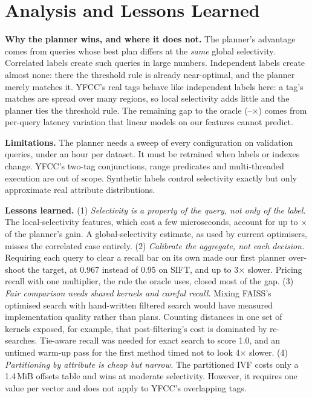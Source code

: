 \documentclass[sigconf,nonacm]{acmart}
\begin{document}
\begin{table}[t]
\centering\scriptsize\setlength{\tabcolsep}{2.6pt}
\caption{End-to-end live runs on test queries (target 0.95, calibration margin 0.005): recall@10 and mean/p95 latency (ms), planning time included; last column is the planner's planning time.}
\label{tab:live}

\end{table}

\section{Analysis and Lessons Learned}

\textbf{Why the planner wins, and where it does not.} The planner's advantage comes from queries whose best plan differs at the \emph{same} global selectivity. Correlated labels create such queries in large numbers. Independent labels create almost none: there the threshold rule is already near-optimal, and the planner merely matches it. YFCC's real tags behave like independent labels here: a tag's matches are spread over many regions, so local selectivity adds little and the planner ties the threshold rule. The remaining gap to the oracle (\mrOracleGapMin--\mrOracleGapMax$\times$) comes from per-query latency variation that linear models on our features cannot predict.

\textbf{Limitations.} The planner needs a sweep of every configuration on validation queries, under an hour per dataset. It must be retrained when labels or indexes change. YFCC's two-tag conjunctions, range predicates and multi-threaded execution are out of scope. Synthetic labels control selectivity exactly but only approximate real attribute distributions.

\textbf{Lessons learned.}
(1) \emph{Selectivity is a property of the query, not only of the label.} The local-selectivity features, which cost a few microseconds, account for up to \mrSiftGlobalSlowdown$\times$ of the planner's gain. A global-selectivity estimate, as used by current optimisers, misses the correlated case entirely.
(2) \emph{Calibrate the aggregate, not each decision.} Requiring each query to clear a recall bar on its own made our first planner over-shoot the target, at 0.967 instead of 0.95 on SIFT, and up to 3$\times$ slower. Pricing recall with one multiplier, the rule the oracle uses, closed most of the gap.
(3) \emph{Fair comparison needs shared kernels and careful recall.} Mixing FAISS's optimised search with hand-written filtered search would have measured implementation quality rather than plans. Counting distances in one set of kernels exposed, for example, that post-filtering's cost is dominated by re-searches. Tie-aware recall was needed for exact search to score 1.0, and an untimed warm-up pass for the first method timed not to look 4$\times$ slower.
(4) \emph{Partitioning by attribute is cheap but narrow.} The partitioned IVF costs only a 1.4\,MiB offsets table and wins at moderate selectivity. However, it requires one value per vector and does not apply to YFCC's overlapping tags.
\end{document}
